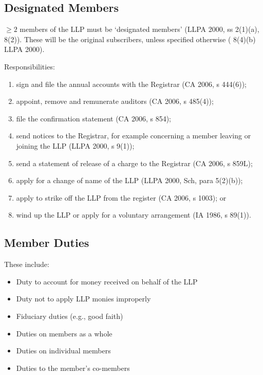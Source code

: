 \documentclass[
]{article}
\providecommand{\tightlist}{%
  \setlength{\itemsep}{0pt}\setlength{\parskip}{0pt}}
\begin{document}
\hypertarget{designated-members}{%
\subsection{Designated Members}\label{designated-members}}

{\(\geq 2\)} members of the LLP must be `designated members' (LLPA 2000,
ss 2(1)(a), 8(2)). These will be the original subscribers, unless
specified otherwise ( 8(4)(b) LLPA 2000).

Responsibilities:

\begin{enumerate}
\tightlist
\item
  sign and file the annual accounts with the Registrar (CA 2006, s
  444(6));
\item
  appoint, remove and remunerate auditors (CA 2006, s 485(4));
\item
  file the confirmation statement (CA 2006, s 854);
\item
  send notices to the Registrar, for example concerning a member leaving
  or joining the LLP (LLPA 2000, s 9(1));
\item
  send a statement of release of a charge to the Registrar (CA 2006, s
  859L);
\item
  apply for a change of name of the LLP (LLPA 2000, Sch, para 5(2)(b));
\item
  apply to strike off the LLP from the register (CA 2006, s 1003); or
\item
  wind up the LLP or apply for a voluntary arrangement (IA 1986, s
  89(1)).
\end{enumerate}

\hypertarget{member-duties}{%
\subsection{Member Duties}\label{member-duties}}

These include:

\begin{itemize}
\tightlist
\item
  Duty to account for money received on behalf of the LLP
\item
  Duty not to apply LLP monies improperly
\item
  Fiduciary duties (e.g., good faith)
\item
  Duties on members as a whole
\item
  Duties on individual members
\item
  Duties to the member's co-members
\end{itemize}
\end{document}
